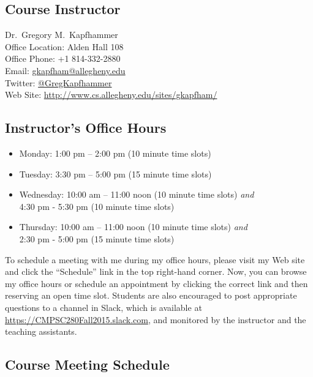 

\usepackage[compact]{titlesec}



\subsection*{Course Instructor}
Dr.\ Gregory M.\ Kapfhammer\\
\noindent Office Location: Alden Hall 108 \\
\noindent Office Phone: +1 814-332-2880 \\
\noindent Email: \url{gkapfham@allegheny.edu} \\
\noindent Twitter: \url{@GregKapfhammer} \\
\noindent Web Site: \url{http://www.cs.allegheny.edu/sites/gkapfham/}

\subsection*{Instructor's Office Hours}

\begin{itemize}
  \itemsep .5em
  \item Monday: 1:00 pm -- 2:00 pm (10 minute time slots)
  \item Tuesday: 3:30 pm -- 5:00 pm (15 minute time slots)
  \item Wednesday: 10:00 am -- 11:00 noon (10 minute time slots) {\em and} \\ \hspace*{.8in}
    4:30 pm - 5:30 pm (10 minute time slots)
  \item Thursday: 10:00 am -- 11:00 noon (10 minute time slots) {\em and} \\ \hspace*{.8in}
    2:30 pm - 5:00 pm (15 minute time slots)
\end{itemize}

\noindent To schedule a meeting with me during my office hours, please visit my Web site and click the ``Schedule'' link
in the top right-hand corner. Now, you can browse my office hours or schedule an appointment by clicking the correct
link and then reserving an open time slot. Students are also encouraged to post appropriate questions to a channel in
Slack, which is available at \url{https://CMPSC280Fall2015.slack.com}, and monitored by the instructor and the teaching
assistants.

\subsection*{Course Meeting Schedule}

